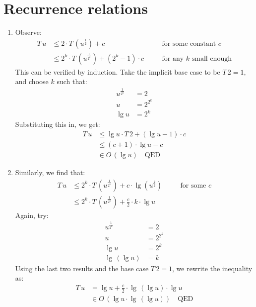 \documentclass[11pt]{article}
\begin{document}
\section{Recurrence relations}
\begin{enumerate}
\item Observe:
  \[
    \begin{aligned}
      T\,u&\leq 2\cdot T\,(u^{\frac{1}{2}})+c \quad &&\textrm{for some constant }c \\
      &\leq 2^k\cdot T\,\left(u^{\frac{1}{2^k}}\right)+\left(2^k-1\right)\cdot c \quad &&\textrm{for any }k\textrm{ small enough}
    \end{aligned}
  \]
  This can be verified by induction. Take the implicit base case to be \(T\,2=1\), and choose \(k\) such that:
  \[
    \begin{aligned}
      u^{\frac{1}{2^k}}&=2 \\
      u&=2^{2^k} \\
      \lg u&=2^k
    \end{aligned}
  \]
  Substituting this in, we get:
  \[
    \begin{aligned}
      T\,u&\leq\lg u\cdot T\,2+\left(\lg u-1\right)\cdot c \\
      &\leq(c+1)\cdot\lg u - c \\
      &\in O\,(\lg u) \quad \textrm{QED}
    \end{aligned}
  \]
\item Similarly, we find that:
  \[
    \begin{aligned}
      T\,u&\leq 2^k\cdot T\,\left(u^{\frac{1}{2^k}}\right)+c\cdot\lg\left(u^{\frac{k}{2}}\right) \quad &&\textrm{for some }c \\
      &\leq 2^k\cdot T\,\left(u^{\frac{1}{2^k}}\right)+\frac{c}{2}\cdot k\cdot\lg u
    \end{aligned}
  \]
  Again, try:
  \[
    \begin{aligned}
      u^{\frac{1}{2^k}}&=2 \\
      u&=2^{2^k} \\
      \lg u&=2^k \\
      \lg\,(\lg u)&=k
    \end{aligned}
  \]
  Using the last two results and the base case \(T\,2=1\), we rewrite the inequality as:
  \[
    \begin{aligned}
      T\,u&=\lg u+\frac{c}{2}\cdot\lg\,(\lg u)\cdot\lg u \\
      &\in O\,(\lg u\cdot\lg\,(\lg u)) \quad \textrm{QED}
    \end{aligned}
  \]
\end{enumerate}
\end{document}
